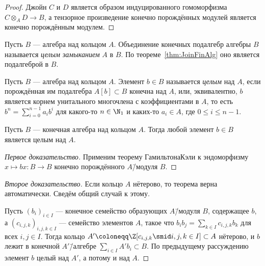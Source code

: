 \documentclass[
	extrafontsizes,
	11pt,
	hyphens,
]{memoir}
\begin{document}
\begin{proof}
Джойн \(C\) и \(D\) является образом индуцированного гомоморфизма \(C \otimes_A D \to B\),
а тензорное произведение конечно порождённых модулей является конечно порождённым модулем. 
\end{proof}

\begin{definition}
Пусть \(B\) --- алгебра над кольцом \(A\).
Объединение конечных подалгебр алгебры \(B\) называется \emph{целым замыканием} \(A\) в \(B\). По теореме~\ref{thm:JoinFinAlg} оно является подалгеброй в \(B\).
\end{definition}

\begin{definition}
Пусть \(B\) --- алгебра над кольцом \(A\).
Элемент \(b \in B\) называется \emph{целым} над \(A\), если
порождённая им подалгебра \(A[b] \subset B\) конечна над \(A\),
или, эквивалентно,
\(b\) является корнем унитального многочлена с коэффициентами в \(A\), то есть
\(b^n = \sum_{i=0}^{n-1} a_i b^i\) для какого-то \(n \in \N_1\) и каких-то \(a_i \in A\), где \(0 \leq i \leq n-1\).
\end{definition}

\begin{theorem}
Пусть \(B\) --- конечная алгебра над кольцом \(A\).%
\label{thm:FinAlgIntegral}
Тогда любой элемент \(b \in B\) является целым над \(A\).
\end{theorem}

\begin{proof}[Первое доказательство]
Применим теорему Гамильтона\namedash{}Кэли к эндоморфизму \(x \mapsto bx : B \to B\) конечно порождённого \(A\)\=/модуля \(B\).
\end{proof}

\begin{proof}[Второе доказательство]
Если кольцо \(A\) нётерово,
то теорема верна автоматически.
Сведём общий случай к этому.

Пусть \((b_i)_{i \in I}\) --- конечное семейство образующих \(A\)\=/модуля \(B\), содержащее \(b\),
а \((c_{i,j,k})_{i,j,k \in I}\) --- семейство элементов \(A\), такое что \(b_i b_j = \sum_{k \in I} c_{i,j,k} b_k\) для всех \(i,j \in I\).
Тогда кольцо \(A' \coloneqq \Z[c_{i,j,k} \smid i,j,k \in I] \subset A\) нётерово, и \(b\) лежит в конечной \(A'\)\=/алгебре \(\sum_{i \in I} A'b_i \subset B\). По предыдущему рассуждению элемент \(b\) целый над \(A'\), а потому и над \(A\).
\end{proof}
\end{document}
